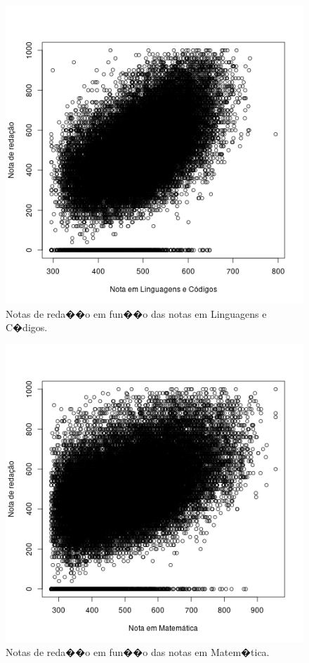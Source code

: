 \documentclass[12pt]{article}
\begin{document}
\begin{minipage}{.5\textwidth}
    \begin{figure}[H]
    \centering\includegraphics[width=.86\linewidth]{../correlacao_nota_lc.png}
    \caption{Notas de reda��o em fun��o das notas em Linguagens e C�digos.}
    \label{fig:correlacao-nota-lc}
    \end{figure}
\end{minipage}%
\begin{minipage}{.5\textwidth}
    \begin{figure}[H]
    \centering\includegraphics[width=.86\linewidth]{../correlacao_nota_mt.png}
    \caption{Notas de reda��o em fun��o das notas em Matem�tica.}
    \label{fig:correlacao-nota-mt}
    \end{figure}
\end{minipage}
\end{document}
